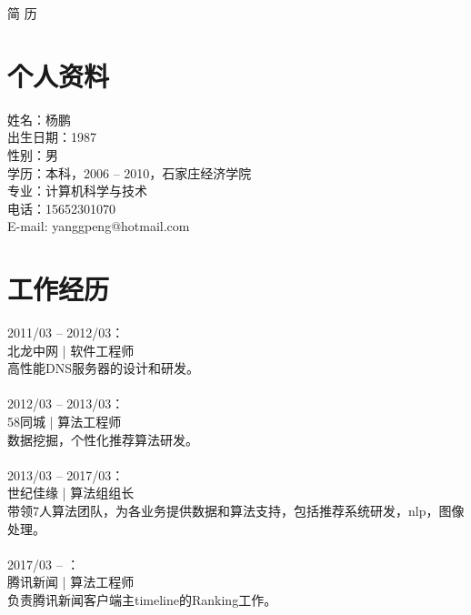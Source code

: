 \documentclass[11pt, a4paper]{article}
\begin{document}
\begin{center}
    \Huge{简{ }{ }历}       %
\end{center}





\section*{个人资料}         %

姓名：杨鹏 \\
出生日期：1987 \\
性别：男 \\
学历：本科，2006 -- 2010，石家庄经济学院 \\
专业：计算机科学与技术 \\
电话：\mbox{15652301070} \\
E-mail: yanggpeng@hotmail.com \\






\section*{工作经历}

2011/03 -- 2012/03： \\
北龙中网 | 软件工程师 \\
高性能DNS服务器的设计和研发。 \\
\\
2012/03 -- 2013/03： \\
58同城 | 算法工程师 \\
数据挖掘，个性化推荐算法研发。 \\
\\
2013/03 -- 2017/03： \\
世纪佳缘 | 算法组组长 \\
带领7人算法团队，为各业务提供数据和算法支持，包括推荐系统研发，nlp，图像处理。 \\
\\
2017/03 -- ： \\
腾讯新闻 | 算法工程师 \\
负责腾讯新闻客户端主timeline的Ranking工作。 \\




\end{document}
